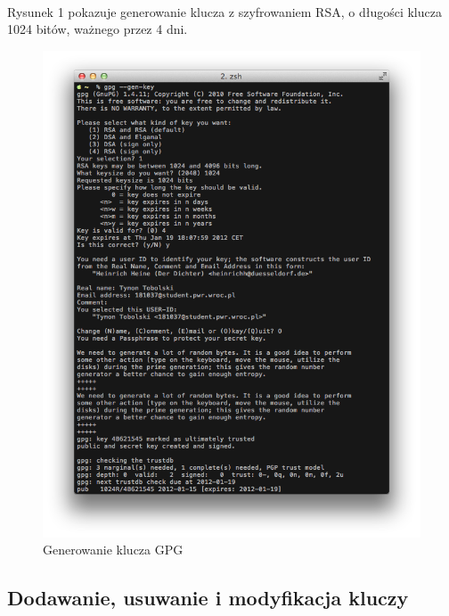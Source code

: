 \documentclass[wide,a4paper,titlepage,12pt] {article}
\begin{document}
  \paragraph{}
  Rysunek 1 pokazuje generowanie klucza z szyfrowaniem RSA, o długości klucza 1024 bitów, ważnego przez 4 dni.

  \begin{figure}[h!]
    \begin{center}
      \includegraphics[width=\textwidth]{img/1.png}
      \caption{Generowanie klucza GPG}
    \end{center}
  \end{figure}

  \newpage
  \paragraph{}
  \newpage

  \subsection{Dodawanie, usuwanie i modyfikacja kluczy}
\end{document}
